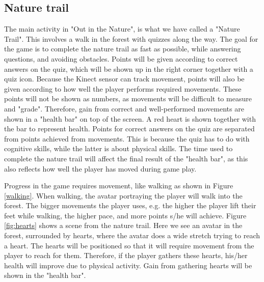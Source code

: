 \subsection{Nature trail}
The main activity in "Out in the Nature", is what we have called a "Nature Trail". This involves a walk in the forest with quizzes along the way. The goal for the game is to complete the nature trail as fast as possible, while answering questions, and avoiding obstacles. Points will be given according to correct answers on the quiz, which will be shown up in the right corner together with a quiz icon. Because the Kinect sensor can track movement, points will also be given according to how well the player performs required movements. These points will not be shown as numbers, as movements will be difficult to measure and "grade". Therefore, gain from correct and well-performed movements are shown in a "health bar" on top of the screen. A red heart is shown together with the bar to represent health. Points for correct answers on the quiz are separated from points achieved from movements. This is because the quiz has to do with cognitive skills, while the latter is about physical skills. The time used to complete the nature trail will affect the final result of the "health bar", as this also reflects how well the player has moved during game play.   

Progress in the game requires movement, like walking as shown in Figure \ref{walking}. When walking, the avatar portraying the player will walk into the forest. The bigger movements the player uses, e.g. the higher the player lift their feet while walking, the higher pace, and more points s/he will achieve. Figure \ref{fig:hearts} shows a scene from the nature trail. Here we see an avatar in the forest, surrounded by hearts, where the avatar does a wide stretch trying to reach a heart. The hearts will be positioned so that it will require movement from the player to reach for them. Therefore, if the player gathers these hearts, his/her health will improve due to physical activity. Gain from gathering hearts will be shown in the "health bar".   


